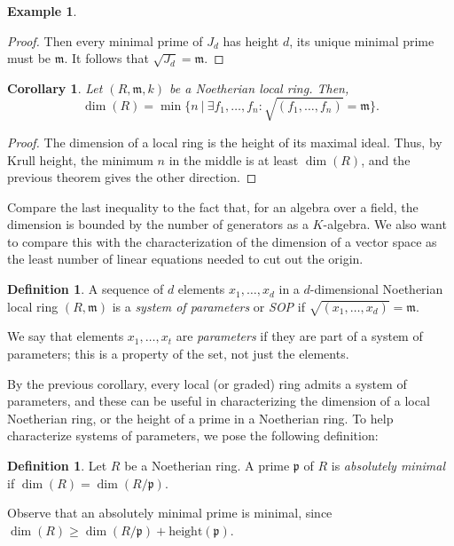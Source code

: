\documentclass{amsart}[12pt]
\newcommand{\p}{{\mathfrak p}}
\newcommand{\m}{{\mathfrak m}}
\numberwithin{equation}{section}
\theoremstyle{plain} %
\newtheorem{corollary}[equation]{Corollary}
\theoremstyle{definition}
\newtheorem{definition}[equation]{Definition}
\newtheorem{ex}[equation]{Example}
\theoremstyle{remark}
\begin{document}
\begin{ex}
\begin{proof}
Then every minimal prime of $J_d$ has height $d$, its unique minimal prime must be $\m$. It follows that $\sqrt{J_d}=\m$.
\end{proof}


\begin{corollary} Let $(R,\m,k)$ be a Noetherian local ring. Then, \[\dim(R)=\min\{ n \ | \ \exists f_1,\dots,f_n : \sqrt{(f_1,\dots,f_n)}=\m \}.\]
	\end{corollary}
\begin{proof}
	The dimension of a local ring is the height of its maximal ideal. Thus, by Krull height, the minimum $n$ in the middle is at least $\dim(R)$, and the previous theorem gives the other direction. \end{proof}

Compare the last inequality to the fact that, for an algebra over a field, the dimension is bounded by the number of generators as a $K$-algebra. We also want to compare this with the characterization of the dimension of a vector space as the least number of linear equations needed to cut out the origin.


\begin{definition}
	A sequence of $d$ elements $x_1,\dots,x_d$ in a $d$-dimensional Noetherian local ring $(R,\m)$ is a \emph{system of parameters} or \emph{SOP} if $\sqrt{(x_1,\dots,x_d)}=\m$.

	We say that elements $x_1,\dots,x_t$ are \emph{parameters} if they are part of a system of parameters; this is a property of the set, not just the elements.
\end{definition}

By the previous corollary, every local (or graded) ring admits a system of parameters, and these can be useful in characterizing the dimension of a local Noetherian ring, or the height of a prime in a Noetherian ring. To help characterize systems of parameters, we pose the following definition:

\begin{definition}
	Let $R$ be a Noetherian ring. A prime $\p$ of $R$ is \emph{absolutely minimal} if $\dim(R)=\dim(R/\p)$.
\end{definition}

Observe that an absolutely minimal prime is minimal, since $\dim(R) \geq \dim(R/\p) + \mathrm{height}(\p)$.


\end{ex}
\end{document}
